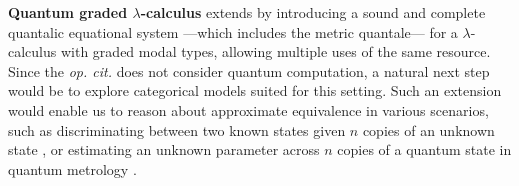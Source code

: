 \begin{comment}
\[
\hspace{-110pt}
\begin{minipage}{0.45\textwidth}
\centering
\begin{tikzpicture}
  \matrix (m) [matrix of math nodes,row sep=3em,column sep=2em,minimum width=1em]
  { 
    \bigoplus_i M_{n_i} \\
     \bigoplus_j M_{n_j}   \\
  };
  \path[-stealth]
    (m-1-1) edge  node [right] {$\Phi$} (m-2-1);
\end{tikzpicture}
\end{minipage}
\hspace{-60pt}
\begin{minipage}{0.45\textwidth}
\centering
\begin{tikzpicture}
  \matrix (m) [matrix of math nodes,row sep=3em,column sep=23em,minimum width=1em]
  {
  (\bigoplus_i M_{n_i})^*&  \bigoplus_i M_{n_i} \\
   (\bigoplus_j M_{n_j})^* &  \bigoplus_j M_{n_j} \\
  };
  \path[-stealth]
    (m-1-1) edge  node [above] {$\varphi \mapsto \left(\sum_{ij} \varphi_1(\ket{j}\bra{i}) \cdot \ket{i} \bra{j}, \ldots, \sum_{ij} \varphi_n(\ket{j}\bra{i}) \cdot \ket{i} \bra{j}\right)   $} (m-1-2)
    (m-2-2) edge [dotted]  node [right] {$\Phi^*$} (m-1-2)
    (m-2-2) edge  node [below] {$ A \mapsto (B \mapsto \tr(AB)) $} (m-2-1)
    (m-2-1) edge  node [right] {$ \varphi \mapsto \varphi \cdot \Phi $} (m-1-1)
    ;
\end{tikzpicture}
\end{minipage}
\]
where $\varphi \in (\bigoplus_i M_{n_i})^*$ is defined as $\varphi(v_1, \ldots, v_n)= \sum_i^n \varphi_i(v_i).$


\vspace{3pt}
\end{comment}


\textbf{Quantum graded $\lambda$-calculus}
  \cite{dahlqvistCompleteVEquationalSystem2023} extends  \cite{dahlqvist2023syntactic} by introducing a sound and complete quantalic equational system ---which includes the metric quantale--- for a $\lambda$-calculus with graded modal types, allowing multiple uses of the same resource. Since the \textit{op. cit.} \cite{dahlqvistCompleteVEquationalSystem2023} does not consider quantum computation, a natural next step would be to explore categorical models suited for this setting. Such an extension would enable us to reason about approximate equivalence in various scenarios, such as discriminating between two known states given $n$ copies of an unknown state \cite{Multiple_copy_two_state_discrimination}, or estimating an unknown parameter across $n$ copies of a quantum state in quantum metrology \cite{Giovannetti_Quantum_Metrology, Zhou_Limits_Noisy_Quantum_Metrology}.


